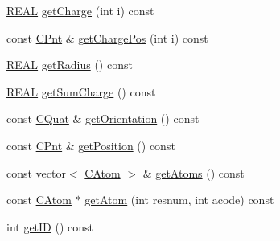 \begin{DoxyCompactItemize}
\item 
\hyperlink{util_8h_a5821460e95a0800cf9f24c38915cbbde}{R\-E\-A\-L} \hyperlink{classCProtein_a199bba5ba36900bdad8fd34bc0cc5342}{get\-Charge} (int i) const 
\item 
const \hyperlink{classCPnt}{C\-Pnt} \& \hyperlink{classCProtein_af41397ca141fb18b7a39854797e0df6a}{get\-Charge\-Pos} (int i) const 
\item 
\hyperlink{util_8h_a5821460e95a0800cf9f24c38915cbbde}{R\-E\-A\-L} \hyperlink{classCProtein_aaa51486082bb376c17cf272ed9ef6bca}{get\-Radius} () const 
\item 
\hyperlink{util_8h_a5821460e95a0800cf9f24c38915cbbde}{R\-E\-A\-L} \hyperlink{classCProtein_add93b850304f89cbb6af897e1df0fe4a}{get\-Sum\-Charge} () const 
\item 
const \hyperlink{classCQuat}{C\-Quat} \& \hyperlink{classCProtein_a65cfe943745c04072d5a03b7caad861e}{get\-Orientation} () const 
\item 
const \hyperlink{classCPnt}{C\-Pnt} \& \hyperlink{classCProtein_a1290a004e6e5854a8df7aa4acf9ba8e0}{get\-Position} () const 
\item 
const vector$<$ \hyperlink{classCAtom}{C\-Atom} $>$ \& \hyperlink{classCProtein_ae44ab2afca86374611113fa26e8c1b2f}{get\-Atoms} () const 
\item 
const \hyperlink{classCAtom}{C\-Atom} $\ast$ \hyperlink{classCProtein_a61914554b1b927e7f2bfa4c12c78ba0a}{get\-Atom} (int resnum, int acode) const 
\item 
int \hyperlink{classCProtein_aa4cd0f117c25ed7e5a84db8e70147014}{get\-I\-D} () const 
\end{DoxyCompactItemize}
